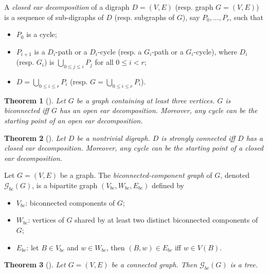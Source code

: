 \documentclass{article}
\newtheorem{thm}{Theorem}
\begin{document}
A \emph{closed ear decomposition} of a digraph $D=(V,E)$ (resp.
graph $G=(V,E)$) is a sequence of sub-digraphs of $D$ (resp.
subgraphs of $G$), say $P_0, ..., P_r$, such that
\begin{itemize}

\item $P_0$ is a cycle;

\item $P_{i+1}$ is a $D_i$-path or a $D_i$-cycle (resp. a $G_i$-path or a $G_i$-cycle), where $D_i$ (resp. $G_i$) is $\bigcup \limits_{0 \le j \le i} P_j$ for all $0 \le i <
r$;

\item $D = \bigcup \limits_{0 \le i \le r}P_i$ (resp. $G = \bigcup \limits_{0 \le i \le r}P_i$).
\end{itemize}

\begin{thm}[\cite{West00}]\label{thm:bi-connected}
Let $G$ be a graph containing at least three vertices. $G$ is
biconnected iff $G$ has an open ear decomposition. Moreover, any
cycle can be the starting point of an open ear decomposition.
\end{thm}

\begin{thm}[\cite{BangGutin00}]\label{thm:strong}
Let $D$ be a nontrivial digraph. $D$ is strongly connected iff $D$
has a closed ear decomposition. Moreover, any cycle can be the
starting point of a closed ear decomposition.
\end{thm}

Let $G=(V,E)$ be a graph. The \emph{biconnected-component graph} of
$G$, denoted $\mathcal{G}_{bc}(G)$, is a bipartite graph
$(V_{bc},W_{bc},E_{bc})$ defined by
\begin{itemize}
\item $V_{bc}$: biconnected components of $G$;

\item $W_{bc}$: vertices of $G$ shared by
at least two distinct biconnected components of $G$;

\item $E_{bc}$: let $B \in V_{bc}$ and $w \in W_{bc}$, then $(B,w) \in E_{bc}$
iff $w \in V(B)$.
\end{itemize}

\begin{thm}[\cite{West00}]\label{thm:biconn-components}
Let $G=(V,E)$ be a connected graph. Then $\mathcal{G}_{bc}(G)$ is a
tree.
\end{thm}
\end{document}
